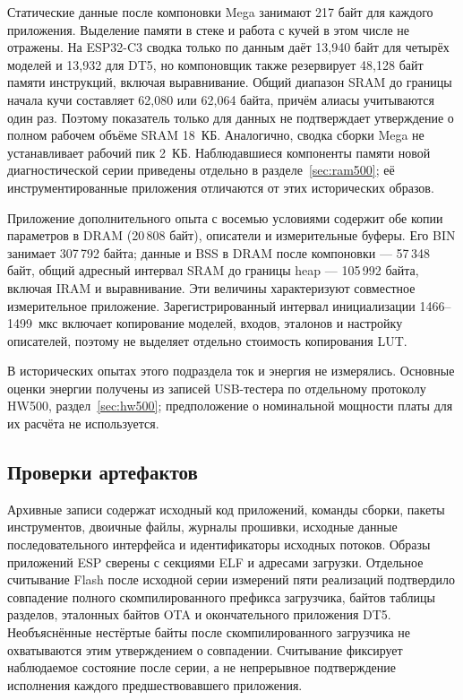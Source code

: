 Статические данные после компоновки Mega занимают 217 байт для каждого приложения. Выделение памяти в стеке и работа с кучей в этом числе не отражены. На ESP32-C3 сводка только по данным даёт 13,940 байт для четырёх моделей и 13,932 для DT5, но компоновщик также резервирует 48,128 байт памяти инструкций, включая выравнивание. Общий диапазон SRAM до границы начала кучи составляет 62,080 или 62,064 байта, причём алиасы учитываются один раз. Поэтому показатель только для данных не подтверждает утверждение о полном рабочем объёме SRAM 18~КБ. Аналогично, сводка сборки Mega не устанавливает рабочий пик 2~КБ. Наблюдавшиеся компоненты памяти новой диагностической серии приведены отдельно в разделе~\ref{sec:ram500}; её инструментированные приложения отличаются от этих исторических образов.

Приложение дополнительного опыта с восемью условиями содержит обе копии параметров в DRAM (20\,808 байт), описатели и измерительные буферы. Его BIN занимает 307\,792 байта; данные и BSS в DRAM после компоновки --- 57\,348 байт, общий адресный интервал SRAM до границы heap --- 105\,992 байта, включая IRAM и выравнивание. Эти величины характеризуют совместное измерительное приложение. Зарегистрированный интервал инициализации 1466--1499~мкс включает копирование моделей, входов, эталонов и настройку описателей, поэтому не выделяет отдельно стоимость копирования LUT.

В исторических опытах этого подраздела ток и энергия не измерялись. Основные оценки энергии получены из записей USB-тестера по отдельному протоколу HW500, раздел~\ref{sec:hw500}; предположение о номинальной мощности платы для их расчёта не используется.

\subsection{Проверки артефактов}
Архивные записи содержат исходный код приложений, команды сборки, пакеты инструментов, двоичные файлы, журналы прошивки, исходные данные последовательного интерфейса и идентификаторы исходных потоков. Образы приложений ESP сверены с секциями ELF и адресами загрузки. Отдельное считывание Flash после исходной серии измерений пяти реализаций подтвердило совпадение полного скомпилированного префикса загрузчика, байтов таблицы разделов, эталонных байтов OTA и окончательного приложения DT5. Необъяснённые нестёртые байты после скомпилированного загрузчика не охватываются этим утверждением о совпадении. Считывание фиксирует наблюдаемое состояние после серии, а не непрерывное подтверждение исполнения каждого предшествовавшего приложения.

